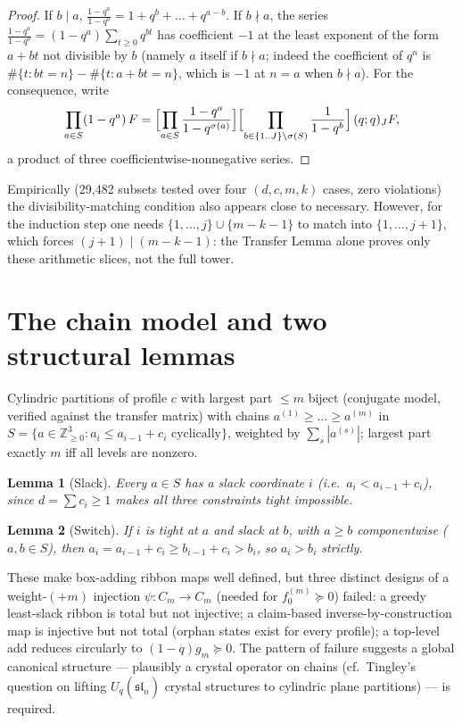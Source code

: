 \documentclass[11pt]{article}
\newtheorem{lemma}{Lemma}
\begin{document}
\begin{proof}
If $b\mid a$, $\frac{1-q^a}{1-q^b}=1+q^b+\dots+q^{a-b}$. If $b\nmid a$, the
series $\frac{1-q^a}{1-q^b}=(1-q^a)\sum_{t\ge0}q^{bt}$ has coefficient $-1$ at
the least exponent of the form $a+bt$ not divisible by $b$ (namely $a$ itself
if $b\nmid a$; indeed the coefficient of $q^n$ is $\#\{t:bt=n\}-\#\{t:a+bt=n\}$,
which is $-1$ at $n=a$ when $b\nmid a$). For the consequence, write
\[
\prod_{a\in S}(1-q^a)\,F
=\Bigl[\prod_{a\in S}\frac{1-q^a}{1-q^{\sigma(a)}}\Bigr]
 \Bigl[\prod_{b\in\{1..J\}\setminus\sigma(S)}\frac{1}{1-q^{b}}\Bigr]
 \,(q;q)_J F,
\]
a product of three coefficientwise-nonnegative series.
\end{proof}

Empirically (29{,}482 subsets tested over four $(d,c,m,k)$ cases, zero
violations) the divisibility-matching condition also appears close to
necessary. However, for the induction step one needs
$\{1,\dots,j\}\cup\{m-k-1\}$ to match into $\{1,\dots,j+1\}$, which forces
$(j+1)\mid(m-k-1)$: the Transfer Lemma alone proves only these arithmetic
slices, not the full tower.

\section{The chain model and two structural lemmas}

Cylindric partitions of profile $c$ with largest part $\le m$ biject
(conjugate model, verified against the transfer matrix) with chains
$a^{(1)}\ge\dots\ge a^{(m)}$ in
$S=\{a\in\mathbb{Z}_{\ge0}^3 : a_i\le a_{i-1}+c_i \text{ cyclically}\}$,
weighted by $\sum_s |a^{(s)}|$; largest part exactly $m$ iff all levels are
nonzero.

\begin{lemma}[Slack]
Every $a\in S$ has a \emph{slack} coordinate $i$ (i.e.\ $a_i<a_{i-1}+c_i$),
since $d=\sum c_i\ge 1$ makes all three constraints tight impossible.
\end{lemma}

\begin{lemma}[Switch]
If $i$ is tight at $a$ and slack at $b$, with $a\ge b$ componentwise
($a,b\in S$), then $a_i=a_{i-1}+c_i\ge b_{i-1}+c_i>b_i$, so $a_i>b_i$ strictly.
\end{lemma}

These make box-adding ribbon maps well defined, but three distinct designs of
a weight-$(+m)$ injection $\psi\colon C_m\to C_m$ (needed for
$f_0^{(m)}\succeq 0$) failed: a greedy least-slack ribbon is total but not
injective; a claim-based inverse-by-construction map is injective but not
total (orphan states exist for every profile); a top-level add reduces
circularly to $(1-q)g_m\succeq 0$. The pattern of failure suggests a global
canonical structure --- plausibly a crystal operator on chains (cf.\ Tingley's
question on lifting $U_q(\widehat{\mathfrak{sl}}_n)$ crystal structures to
cylindric plane partitions) --- is required.
\end{document}
